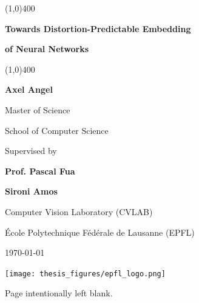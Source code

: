 \documentclass[a4paper,12pt]{report}
\newcommand{\myname}{Axel Angel}
\begin{document}
\begin{titlepage}
\begin{center}
    \vspace*{0.5cm}

    \line(1,0){400}
    \vspace{0.5cm}

    {\bf \Large Towards Distortion-Predictable Embedding}

    \vspace{0.5cm}

    {\bf \Large of Neural Networks}

    \vspace{0.5cm}
    \line(1,0){400}

    \vspace{1.5cm}

    {\bf \myname}

    Master of Science

    School of Computer Science

    \vspace{1.6cm}

    Supervised by

    {\bf Prof. Pascal Fua}

    {\bf Sironi Amos}

    \vspace{0.8cm}

    Computer Vision Laboratory (CVLAB)

    École Polytechnique Fédérale de Lausanne (EPFL)

    \vspace{3cm}

    \today

    \vfill

    \texttt{[image: thesis\_figures/epfl\_logo.png]}


    \end{center}
\end{titlepage}

\newpage
\thispagestyle{empty}
\vfill
\begin{center}
    Page intentionally left blank.
\end{center}
\end{document}
